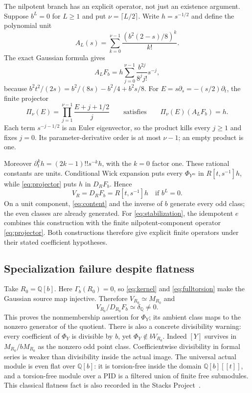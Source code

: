 \documentclass[11pt]{article}
\theoremstyle{definition}\newtheorem{definition}[theorem]{Definition}
\theoremstyle{remark}\newtheorem{remark}[theorem]{Remark}
\begin{document}
The nilpotent branch has an explicit operator, not just an
existence argument. Suppose $b^L=0$ for $L\ge1$ and put
$\nu=\lceil L/2\rceil$. Write $h=s^{-1/2}$ and define the
polynomial unit
\[
 A_L(s)=\sum_{k=0}^{\nu-1}\frac{(b^2(2-s)/8)^k}{k!}.
\]
The exact Gaussian formula gives
\[
 A_LF_b=h\sum_{j=0}^{\nu-1}\frac{b^{2j}}{8^jj!}s^{-j},
\]
because $b^2t^2/(2s)=b^2/(8s)-b^2/4+b^2s/8$.
For $E=s\partial_s=-(s/2)\partial_t$, the finite projector
\begin{equation}\label{eq:projector}
 \Pi_\nu(E)=\prod_{j=1}^{\nu-1}\frac{E+j+1/2}{j}
 \qquad\text{satisfies}\qquad
 \Pi_\nu(E)(A_LF_b)=h.
\end{equation}
Each term $s^{-j-1/2}$ is an Euler eigenvector, so the product
kills every $j\ge1$ and fixes $j=0$. Its parameter-derivative
order is at most $\nu-1$; an empty product is one.

Moreover
$\partial_t^kh=(2k-1)!!s^{-k}h$, with the $k=0$ factor one.
These rational constants are units. Conditional Wick expansion
puts every $\Phi_{Y^m}$ in $R[t,s^{-1}]h$, while
\eqref{eq:projector} puts $h$ in $D_RF_b$. Hence
\[
 V_R=D_RF_b=R[t,s^{-1}]h\quad\text{if }b^L=0.
\]
On a unit component, \eqref{eq:content} and the inverse of $b$
generate every odd class; the even classes are already generated.
For \eqref{eq:stabilization}, the idempotent $e$ combines this
construction with the finite nilpotent-component operator
\eqref{eq:projector}. Both constructions therefore give explicit
finite operators under their stated coefficient hypotheses.

\subsection{Specialization failure despite flatness}

Take $R_0=\mathbb Q[b]$. Here $\Gamma_b(R_0)=0$, so
\eqref{eq:kernel} and \eqref{eq:fulltorsion} make the Gaussian
source map injective. Therefore $V_{R_0}\simeq M_{R_0}$ and
\[
 V_{R_0}/D_{R_0}F_b\simeq\delta_{\mathbb Q}\ne0.
\]
This proves the nonmembership assertion for $\Phi_Y$; its
ambient class maps to the nonzero generator of the quotient.
There is also a concrete divisibility warning: every coefficient
of $\Phi_Y$ is divisible by $b$, yet $\Phi_Y\notin bV_{R_0}$.
Indeed $[Y]$ survives in $M_{R_0}/bM_{R_0}$ as the nonzero
odd point class. Coefficientwise divisibility in formal series
is weaker than divisibility inside the actual image.
The universal actual module is even flat over $\mathbb Q[b]$:
it is torsion-free inside the domain $\mathbb Q[b][[t]]$, and
a torsion-free module over a PID is a filtered union of finite
free submodules. This classical flatness fact is also recorded
in the Stacks Project~\cite[Lemma~15.22.11]{Stacks}.
\end{document}
